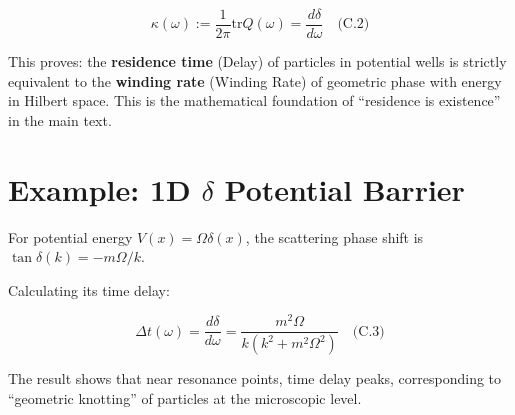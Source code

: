 $$\kappa(\omega) := \frac{1}{2\pi} \text{tr} Q(\omega) = \frac{d\delta}{d\omega} \quad \text{(C.2)}$$

This proves: the \textbf{residence time} (Delay) of particles in potential wells is strictly equivalent to the \textbf{winding rate} (Winding Rate) of geometric phase with energy in Hilbert space. This is the mathematical foundation of ``residence is existence'' in the main text.

\section{Example: 1D $\delta$ Potential Barrier}

For potential energy $V(x) = \Omega \delta(x)$, the scattering phase shift is $\tan \delta(k) = -m\Omega/k$.

Calculating its time delay:

$$\Delta t(\omega) = \frac{d\delta}{d\omega} = \frac{m^2 \Omega}{k(k^2 + m^2 \Omega^2)} \quad \text{(C.3)}$$

The result shows that near resonance points, time delay peaks, corresponding to ``geometric knotting'' of particles at the microscopic level.

